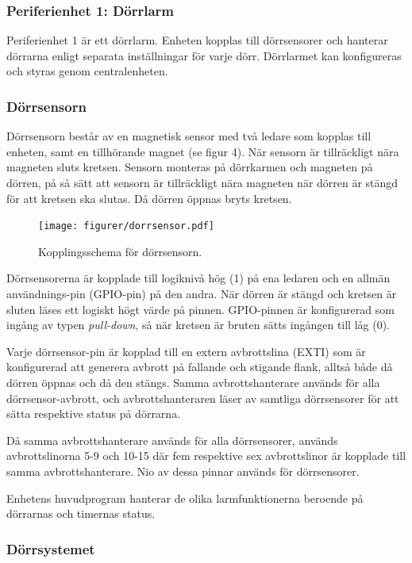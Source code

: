 \subsubsection{Periferienhet 1: Dörrlarm}

Periferienhet 1 är ett dörrlarm. Enheten kopplas till dörrsensorer och hanterar dörrarna enligt separata inställningar för varje dörr. Dörrlarmet kan konfigureras och styras genom centralenheten.

\subsubsection*{Dörrsensorn}

Dörrsensorn består av en magnetisk sensor med två ledare som kopplas till enheten, samt en tillhörande magnet (se figur 4). När sensorn är tillräckligt nära magneten sluts kretsen. Sensorn monteras på dörrkarmen och magneten på dörren, på så sätt att sensorn är tillräckligt nära magneten när dörren är stängd för att kretsen ska slutas. Då dörren öppnas bryts kretsen.

\begin{figure}[h!]
	\centering\texttt{[image: figurer/dorrsensor.pdf]}
	\caption{Kopplingsschema för dörrsensorn.}
	\label{figur:dörrsensor}
\end{figure}

Dörrsensorerna är kopplade till logiknivå hög (1) på ena ledaren och en allmän användnings-pin (GPIO-pin) på den andra. När dörren är stängd och kretsen är sluten läses ett logiskt högt värde på pinnen. GPIO-pinnen är konfigurerad som ingång av typen \textit{pull-down}, så när kretsen är bruten sätts ingången till låg (0).

Varje dörrsensor-pin är kopplad till en extern avbrottslina (EXTI) som är konfigurerad att generera avbrott på fallande och stigande flank, alltså både då dörren öppnas och då den stängs. Samma avbrottshanterare används för alla dörrsensor-avbrott, och avbrottshanteraren läser av samtliga dörrsensorer för att sätta respektive status på dörrarna.

Då samma avbrottshanterare används för alla dörrsensorer, används avbrottslinorna 5-9 och 10-15 där fem respektive sex avbrottslinor är kopplade till samma avbrottshanterare. Nio av dessa pinnar används för dörrsensorer.

Enhetens huvudprogram hanterar de olika larmfunktionerna beroende på dörrarnas och timernas status.

\subsubsection*{Dörrsystemet}

